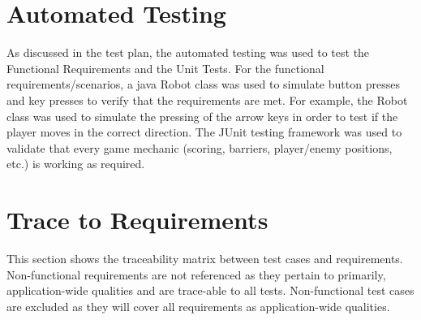 \documentclass[12pt, titlepage]{article}
\begin{document}
\section{Automated Testing}

As discussed in the test plan, the automated testing was used to test the Functional Requirements and the Unit Tests. For the functional requirements/scenarios, a java Robot class was used to simulate button presses and key presses to verify that the requirements are met. For example, the Robot class was used to simulate the pressing of the arrow keys in order to test if the player moves in the correct direction. The JUnit testing framework was used to validate that every game mechanic (scoring, barriers, player/enemy positions, etc.) is working as required.
		
\section{Trace to Requirements}
This section shows the traceability matrix between test cases and requirements. Non-functional requirements are not referenced as they pertain to primarily, application-wide qualities and are trace-able to all tests. Non-functional test cases are excluded as they will cover all requirements as application-wide qualities.
\end{document}
